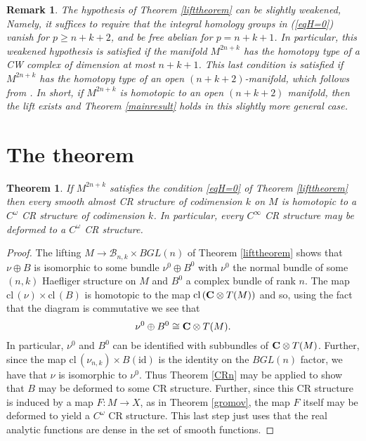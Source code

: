 \documentclass{amsart}
\newtheorem{theorem}{Theorem}[section]
\newtheorem{remark}{Remark}
\begin{document}
\begin{remark}
The hypothesis of Theorem \ref{lifttheorem} can be slightly weakened,
Namely, it suffices to require that the integral homology groups in
(\ref{eqH=0}) vanish for $p \geq n+k+2$, and be free abelian for $p =
n+k+1$.  In particular, this weakened hypothesis is satisfied if the
manifold $M^{2n+k}$ has the homotopy type of a CW complex of dimension
at most $n+k+1$.  This last condition is satisfied if $M^{2n+k}$ has
the homotopy type of an open $(n+k+2)$-manifold, which follows from
\cite[Lemma 1]{Ph}.  In short, if $M^{2n+k}$ is homotopic to an open
$(n+k+2)$ manifold, then the lift exists and Theorem \ref{mainresult} holds in
this slightly more general case.
   

\end{remark}

\section{The theorem}

\begin{theorem}\label{main}
If $M^{2n+k}$ satisfies the condition \eqref{eqH=0} of Theorem \ref{lifttheorem} then
every smooth   almost CR structure of codimension $k$ on $M$ is
homotopic to a $C^\omega$ CR structure of codimension $k$.  
In particular, every $C^\infty$ CR structure may be deformed to a
$C^\omega$ CR structure.
\end{theorem}

\begin{proof}
The lifting $M\to {{\mathcal B}}_{n,k} \times BGL(n)$ of Theorem \ref{lifttheorem}
shows that $\nu \oplus B$ is isomorphic to some bundle 
$\nu^0 \oplus B^0$ with $\nu ^0$ the normal bundle of some $(n,k)$ Haefliger structure
on $M$ and $B^0$ a complex bundle of rank $n$.  The map 
$\mathrm{cl}\,(\nu) \times \textrm{cl}\,(B)$ is homotopic to the map $\mathrm{cl}\,({{\bf{C}}\otimes T(M)})$ and so, using
the fact that the diagram is commutative we see that 
\[
\nu ^0\oplus B^0\cong {{\bf{C}}\otimes T(M)} .
\]
In particular, $\nu ^0$ and $B^0$ can be identified with subbundles of
${{\bf{C}}\otimes T(M)} $.  Further, since the map $\mathrm{cl}\,(\nu_{n,k})\times B(\textrm{id})$ 
is the identity on the $BGL(n)$ factor, we have that $\nu$
is isomorphic to $\nu ^0$. 
Thus Theorem
\ref{CRn} may be applied to show that  $B$ may be deformed to some CR structure.  Further, since
this CR structure is induced by a map $F:M\to X$, as in Theorem
\ref{gromov}, the map $F$ itself may be deformed to yield a $C^\omega$
CR structure.  This last step just uses that the real analytic
functions are dense in the set of smooth functions.
\end{proof}
\end{document}
